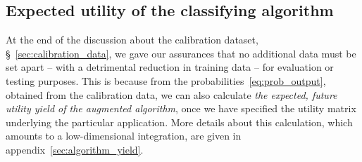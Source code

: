 \documentclass[\ifafour a4paper,12pt,\else a5paper,10pt,\fi%
onecolumn,oneside,article,%
british%
]{memoir}
\theoremstyle{remark}
\theoremstyle{innote}
\renewcommand*{\|}[1][]{\nonscript\:#1\vert\nonscript\:\mathopen{}}
\newcommand*{\sect}{\S}%
\begin{document}
\subsection{Expected utility of the classifying algorithm}
\label{sec:yield_of_classifier}

At the end of the discussion about the calibration dataset, \sect~\ref{sec:calibration_data}, we gave our assurances that no additional data must be set apart -- with a detrimental reduction in training data -- for evaluation or testing purposes. This is because from the probabilities~\eqref{eq:prob_output}, obtained from the calibration data, we can also calculate \emph{the expected, future utility yield of the augmented algorithm}, once we have specified the utility matrix underlying the particular application. More details about this calculation, which amounts to a low-dimensional integration, are given in appendix~\ref{sec:algorithm_yield}.
\end{document}
